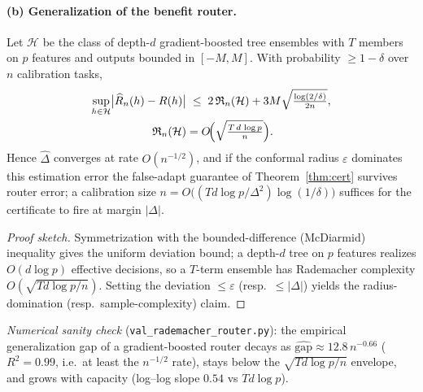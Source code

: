 \paragraph{(b) Generalization of the benefit router.}
\begin{proposition}\label{thm:router-rad}
Let $\mathcal H$ be the class of depth-$d$ gradient-boosted tree ensembles with $T$ members on $p$
features and outputs bounded in $[-M,M]$. With probability $\ge1-\delta$ over $n$ calibration tasks,
\[
\begin{aligned}
\sup_{h\in\mathcal H}\bigl|\widehat R_n(h)-R(h)\bigr| &\;\le\;2\,\mathfrak R_n(\mathcal H)+3M\sqrt{\tfrac{\log(2/\delta)}{2n}},\\
\mathfrak R_n(\mathcal H) &=O\!\Bigl(\sqrt{\tfrac{T\,d\,\log p}{n}}\Bigr).
\end{aligned}
\]
Hence $\widehat\Delta$ converges at rate $O(n^{-1/2})$, and if the conformal radius $\varepsilon$
dominates this estimation error the false-adapt guarantee of Theorem~\ref{thm:cert} survives router
error; a calibration size $n=O\!\bigl((T d\log p/\Delta^2)\log(1/\delta)\bigr)$ suffices for the
certificate to fire at margin $|\Delta|$.
\end{proposition}
\begin{proof}[Proof sketch]
Symmetrization with the bounded-difference (McDiarmid) inequality gives the uniform deviation
bound; a depth-$d$ tree on $p$ features realizes $O(d\log p)$ effective decisions, so a $T$-term
ensemble has Rademacher complexity $O(\sqrt{Td\log p/n})$. Setting the deviation $\le\varepsilon$
(resp.\ $\le|\Delta|$) yields the radius-domination (resp.\ sample-complexity) claim. \qedhere
\end{proof}
\noindent\emph{Numerical sanity check} (\texttt{val\_rademacher\_router.py}): the empirical
generalization gap of a gradient-boosted router decays as
$\widehat{\mathrm{gap}}\approx 12.8\,n^{-0.66}$ ($R^2=0.99$, i.e.\ at least the $n^{-1/2}$ rate),
stays below the $\sqrt{Td\log p/n}$ envelope, and grows with capacity (log--log slope $0.54$ vs
$Td\log p$).

